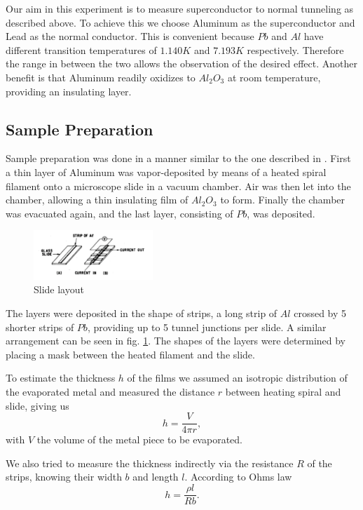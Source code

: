 Our aim in this experiment is to measure superconductor to normal tunneling as described above. To achieve this we choose Aluminum as the superconductor and Lead as the normal conductor. This is convenient because $Pb$ and $Al$ have different transition temperatures of $1.140 K$ and $7.193 K$ respectively. Therefore the range in between the two allows the observation of the desired effect. Another benefit is that Aluminum readily oxidizes to $Al_2O_3$ at room temperature, providing an insulating layer.

\subsection{Sample Preparation}
Sample preparation was done in a manner similar to the one described in \cite{giaever2}. First a thin layer of Aluminum was vapor-deposited by means of a heated spiral filament onto a microscope slide in a vacuum chamber. Air was then let into the chamber, allowing a thin insulating film of $Al_2O_3$ to form. Finally the chamber was evacuated again, and the last layer, consisting of $Pb$, was deposited.

\begin{figure}[h!]
\centering
\includegraphics[width=0.4\textwidth]{sample.pdf}
\caption{Slide layout\label{sample}}
\end{figure}

The layers were deposited in the shape of strips, a long strip of $Al$ crossed by 5 shorter strips of $Pb$, providing up to 5 tunnel junctions per slide. A similar arrangement can be seen in fig. \ref{sample}. The shapes of the layers were determined by placing a mask between the heated filament and the slide.

To estimate the thickness $h$ of the films  we assumed an isotropic distribution of the evaporated metal and measured the distance $r$ between heating spiral and slide, giving us 
\begin{equation}\label{thickness1}
h=\frac{V}{4\pi r},
\end{equation}
with $V$ the volume of the metal piece to be evaporated.

We also tried to measure the thickness indirectly via the resistance $R$ of the strips, knowing their width $b$ and length $l$. According to Ohms law 
\begin{equation}\label{thickness2}
h=\frac{\rho l}{Rb}. 
\end{equation}

